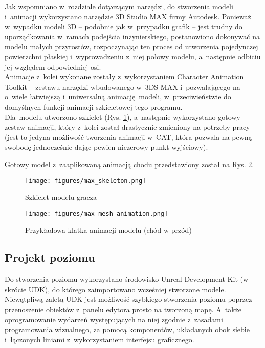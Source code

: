 Jak wspomniano w~rozdziale dotyczącym narzędzi, do stworzenia modeli i~animacji wykorzystano narzędzie 3D Studio MAX firmy Autodesk. Ponieważ w~wypadku modeli 3D -- podobnie jak w~przypadku grafik -- jest trudny do uporządkowania w~ramach podejścia inżynierskiego, postanowiono dokonywać na modelu małych przyrostów, rozpoczynając ten proces od utworzenia pojedynczej powierzchni płaskiej i~wyprowadzeniu z~niej połowy modelu, a~następnie odbiciu jej względem odpowiedniej osi.\\
Animacje z~kolei wykonane zostały z~wykorzystaniem Character Animation Toolkit -- zestawu narzędzi wbudowanego w~3DS MAX i~pozwalającego na o~wiele łatwiejszą i~uniwersalną animację~modeli, w~przeciwieństwie do domyślnych funkcji animacji szkieletowej tego programu.\\Dla~modelu utworzono szkielet (Rys. \ref{max_skeleton}), a~następnie wykorzystano gotowy zestaw animacji, który z~kolei został drastycznie zmieniony na potrzeby pracy (jest to jedyna możliwość tworzenia animacji w~CAT, która pozwala na pewną swobodę jednocześnie dając pewien niezerowy punkt wyjściowy).

Gotowy model z~zaaplikowaną animacją chodu przedstawiony został na Rys. \ref{max_animated}.

\begin{figure}
\begin{center}
\texttt{[image: figures/max\_skeleton.png]}
\caption{Szkielet modelu gracza}
\label{max_skeleton}
\end{center}
\end{figure}

\begin{figure}
\begin{center}
\texttt{[image: figures/max\_mesh\_animation.png]}
\caption{Przykładowa klatka animacji modelu (chód w przód)}
\label{max_animated}
\end{center}
\end{figure}

\subsection{Projekt poziomu}

Do stworzenia poziomu wykorzystano środowisko Unreal Development Kit (w skrócie UDK), do którego zaimportowano wcześniej stworzone modele. Niewątpliwą zaletą UDK jest możliwość szybkiego stworzenia poziomu poprzez przenoszenie obiektów z~panelu edytora prosto na tworzoną mapę. A~także oprogramowanie wydarzeń występujących na niej zgodnie z~zasadami programowania wizualnego, za pomocą komponentów, układanych obok siebie i~łączonych liniami z~wykorzystaniem interfejsu graficznego.

